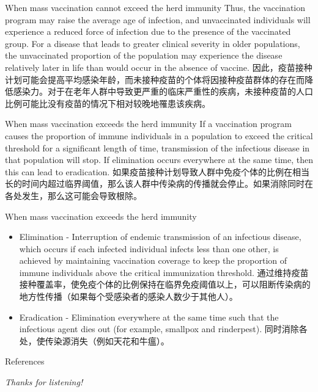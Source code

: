 \documentclass[
  notheorems,
  aspectratio=54,
]{beamer}
\begin{document}
\begin{frame}{When mass vaccination cannot exceed the herd immunity}
Thus, the vaccination program may raise the average age of infection, and unvaccinated individuals will experience a reduced force of infection due to the presence of the vaccinated group. For a disease that leads to greater clinical severity in older populations, the unvaccinated proportion of the population may experience the disease relatively later in life than would occur in the absence of vaccine. 因此，疫苗接种计划可能会提高平均感染年龄，而未接种疫苗的个体将因接种疫苗群体的存在而降低感染力。对于在老年人群中导致更严重的临床严重性的疾病，未接种疫苗的人口比例可能比没有疫苗的情况下相对较晚地罹患该疾病。
\end{frame}

\begin{frame}{When mass vaccination exceeds the herd immunity}
  If a vaccination program causes the proportion of immune individuals in a population to exceed the critical threshold for a significant length of time, transmission of the infectious disease in that population will stop. If elimination occurs everywhere at the same time, then this can lead to eradication. 如果疫苗接种计划导致人群中免疫个体的比例在相当长的时间内超过临界阈值，那么该人群中传染病的传播就会停止。如果消除同时在各处发生，那么这可能会导致根除。
\end{frame}

\begin{frame}{When mass vaccination exceeds the herd immunity}
  \begin{itemize}
    \item Elimination - 
      Interruption of endemic transmission of an infectious disease, which occurs if each infected individual infects less than one other, is achieved by maintaining vaccination coverage to keep the proportion of immune individuals above the critical immunization threshold. 通过维持疫苗接种覆盖率，使免疫个体的比例保持在临界免疫阈值以上，可以阻断传染病的地方性传播（如果每个受感染者的感染人数少于其他人）。
    \item Eradication - 
      Elimination everywhere at the same time such that the infectious agent dies out (for example, smallpox and rinderpest). 同时消除各处，使传染源消失（例如天花和牛瘟）。
  \end{itemize}
\end{frame}

\nocite{*}
\begin{frame}{References}
    \printbibliography
\end{frame}

\begin{frame}{}
  \centering \Huge
  \emph{Thanks for listening!}
\end{frame}
\end{document}
